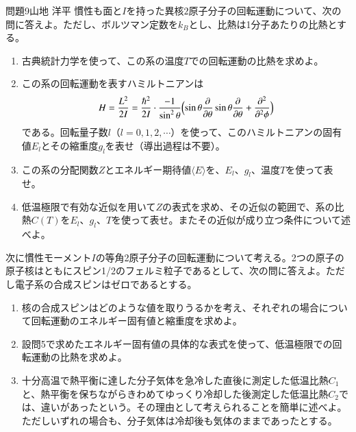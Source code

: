 \documentclass[fleqn]{jbook}
\def\varg{g}
\begin{document}
\begin{question}{問題9}{山地 洋平}
慣性も面と$I$を持った異核$2$原子分子の回転運動について、次の問に答えよ。ただし、ボルツマン定数を$k_B$とし、比熱は1分子あたりの比熱とする。
\begin{enumerate}
\item 古典統計力学を使って、この系の温度$T$での回転運動の比熱を求めよ。
\item この系の回転運動を表すハミルトニアンは
\begin{eqnarray}
H=\frac{L^2}{2I}=\frac{\hbar^2}{2I}\cdot\frac{-1}{\sin^2\theta}\Bigl( \sin\theta\frac{\partial}{\partial\theta} \sin\theta\frac{\partial}{\partial\theta}+\frac{\partial^2}{\partial^2\phi} \Bigl)
\end{eqnarray}
である。回転量子数$l$（$l=0,1,2,\cdots$）を使って、このハミルトニアンの固有値$E_l$とその縮重度$\varg_l$を表せ（導出過程は不要）。
\item この系の分配関数$Z$とエネルギー期待値$\langle E\rangle$を、$E_l$、$\varg_l$、温度$T$を使って表せ。
\item 低温極限で有効な近似を用いて$Z$の表式を求め、その近似の範囲で、系の比熱$C(T)$を$E_l$、$\varg_l$、$T$を使って表せ。またその近似が成り立つ条件について述べよ。
\end{enumerate}
次に慣性モーメント$I$の等角2原子分子の回転運動について考える。2つの原子の原子核はともにスピン1/2のフェルミ粒子であるとして、次の問に答えよ。ただし電子系の合成スピンはゼロであるとする。
\begin{enumerate}
\item 核の合成スピンはどのような値を取りうるかを考え、それぞれの場合について回転運動のエネルギー固有値と縮重度を求めよ。
\item 設問5で求めたエネルギー固有値の具体的な表式を使って、低温極限での回転運動の比熱を求めよ。
\item 十分高温で熱平衡に達した分子気体を急冷した直後に測定した低温比熱$C_1$と、熱平衡を保ちながらきわめてゆっくり冷却した後測定した低温比熱$C_2$では、違いがあったという。その理由として考えられることを簡単に述べよ。ただしいずれの場合も、分子気体は冷却後も気体のままであったとする。
\end{enumerate}
\end{question}
\end{document}
